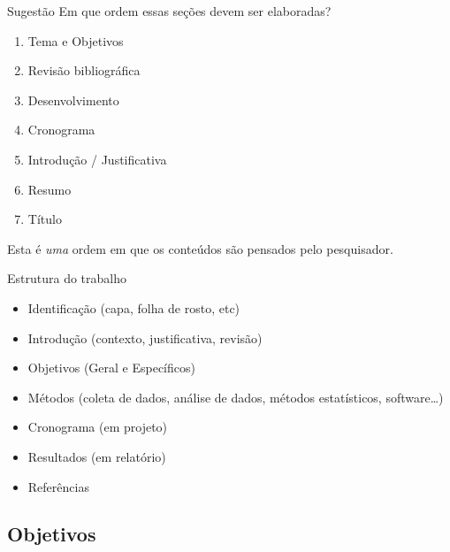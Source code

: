 \documentclass{beamer}
\begin{document}
\begin{frame}{Sugestão}
  \footnotesize
Em que ordem essas seções devem ser elaboradas?
\begin{enumerate}
  \footnotesize
\item Tema e Objetivos
\item Revisão bibliográfica
\item Desenvolvimento
\item Cronograma
\item Introdução / Justificativa
\item Resumo
\item Título
\end{enumerate}

\vfill
Esta é {\em uma} ordem em que os conteúdos são pensados pelo pesquisador.

\end{frame}



\begin{frame}{Estrutura do trabalho}
  \begin{itemize}
    \footnotesize
  \item<1-> Identificação (capa, folha de rosto, etc)
  \item<1-> Introdução (contexto, justificativa, revisão)
  \item<1-> Objetivos (Geral e Específicos)
  \item<1-> Métodos (coleta de dados, análise de dados, métodos estatísticos, software\ldots)
  \item<1-> Cronograma (em projeto)
  \item Resultados (em relatório)
  \item<1-> Referências
  \end{itemize}
\end{frame}

\subsection{Objetivos}
\end{document}
